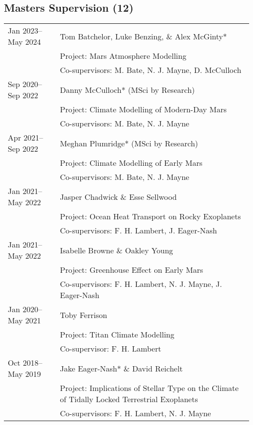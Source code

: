 \documentclass[a4paper, 11pt]{article}
\begin{document}
\subsection*{Masters Supervision (12)}
\begin{tabularx}{\linewidth}{@{}l X@{}}
Jan 2023--May 2024 & Tom Batchelor, Luke Benzing, \& Alex McGinty* \\
                   & Project: Mars Atmosphere Modelling \\
                   & Co-supervisors: M. Bate, N. J. Mayne, D. McCulloch \\
Sep 2020--Sep 2022 & Danny McCulloch* (MSci by Research) \\
                   & Project: Climate Modelling of Modern-Day Mars \\
                   & Co-supervisors: M. Bate, N. J. Mayne \\
Apr 2021--Sep 2022 & Meghan Plumridge* (MSci by Research) \\
                   & Project: Climate Modelling of Early Mars \\
                   & Co-supervisors: M. Bate, N. J. Mayne \\
Jan 2021--May 2022 & Jasper Chadwick \& Esse Sellwood \\
                   & Project: Ocean Heat Transport on Rocky Exoplanets \\
                   & Co-supervisors: F. H. Lambert, J. Eager-Nash \\
Jan 2021--May 2022 & Isabelle Browne \& Oakley Young \\
                   & Project: Greenhouse Effect on Early Mars \\
                   & Co-supervisors: F. H. Lambert, N. J. Mayne, J. Eager-Nash \\
Jan 2020--May 2021 & Toby Ferrison \\
                   & Project: Titan Climate Modelling \\
                   & Co-supervisor: F. H. Lambert \\
Oct 2018--May 2019 & Jake Eager-Nash* \& David Reichelt \\
                   & Project: Implications of Stellar Type on the Climate of Tidally Locked Terrestrial Exoplanets \\
                   & Co-supervisors: F. H. Lambert, N. J. Mayne \\
\end{tabularx}
\end{document}
